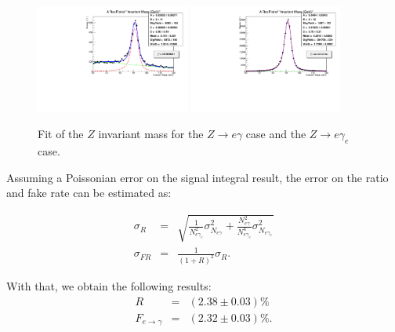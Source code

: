 \begin{figure}[H]
\begin{center}
{\label{Zep}\includegraphics[width=0.45\textwidth]{efake_figs/Zep_FullMass.pdf}}
{\label{Zek}\includegraphics[width=0.45\textwidth]{efake_figs/Zek_FullMass.pdf}}
\caption{Fit of the $Z$ invariant mass for the $Z\rightarrow e \gamma$ case and the $Z\rightarrow e \gamma_e$ case.}
\label{Zeall}
\end{center}
\end{figure}


Assuming a Poissonian error on the signal integral result, the error on the ratio and fake rate can be estimated as:

\begin{eqnarray}
\sigma_R &=& \sqrt{ \frac{1}{N_{e\gamma_e}^2}\sigma_{N_{e\gamma}}^2 + \frac{N_{e\gamma}^2}{N_{e\gamma_e}^4}\sigma_{N_{e\gamma_e}}^2 } \\
\sigma_{FR} &=& \frac{1}{\left( 1 + R \right)^2}\sigma_R.
\end{eqnarray}

With that, we obtain the following results:
\begin{eqnarray}
R &=& \left( 2.38 \pm 0.03 \right)\% \\
F_{e\rightarrow \gamma} &=& \left( 2.32\pm 0.03 \right)\%.
\end{eqnarray}

